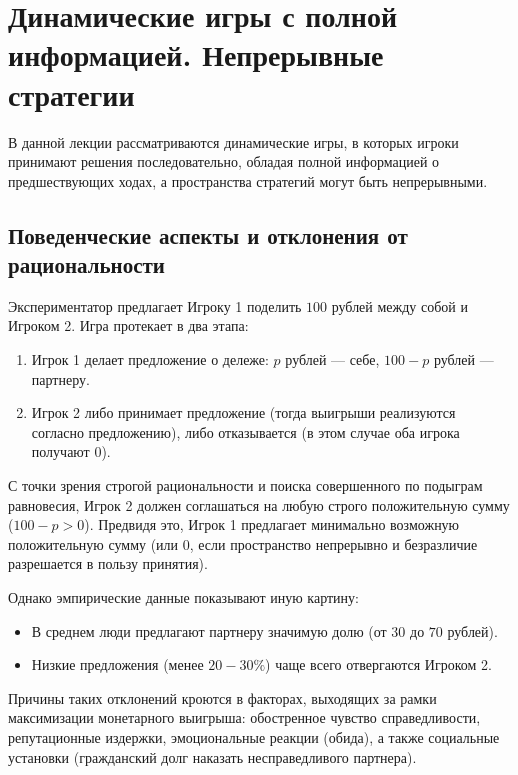 \section{Динамические игры с полной информацией. Непрерывные стратегии}

В данной лекции рассматриваются динамические игры, в которых игроки принимают решения последовательно, обладая полной информацией о предшествующих ходах, а пространства стратегий могут быть непрерывными.

\subsection{Поведенческие аспекты и отклонения от рациональности}

\begin{example}
Экспериментатор предлагает Игроку 1 поделить $100$ рублей между собой и Игроком 2. Игра протекает в два этапа:
\begin{enumerate}
    \item Игрок 1 делает предложение о дележе: $p$ рублей --- себе, $100 - p$ рублей --- партнеру.
    \item Игрок 2 либо принимает предложение (тогда выигрыши реализуются согласно предложению), либо отказывается (в этом случае оба игрока получают $0$).
\end{enumerate}
С точки зрения строгой рациональности и поиска совершенного по подыграм равновесия, Игрок 2 должен соглашаться на любую строго положительную сумму ($100 - p > 0$). Предвидя это, Игрок 1 предлагает минимально возможную положительную сумму (или $0$, если пространство непрерывно и безразличие разрешается в пользу принятия). 

Однако эмпирические данные показывают иную картину:
\begin{itemize}
    \item В среднем люди предлагают партнеру значимую долю (от $30$ до $70$ рублей).
    \item Низкие предложения (менее $20-30\%$) чаще всего отвергаются Игроком 2.
\end{itemize}
Причины таких отклонений кроются в факторах, выходящих за рамки максимизации монетарного выигрыша: обостренное чувство справедливости, репутационные издержки, эмоциональные реакции (обида), а также социальные установки (гражданский долг наказать несправедливого партнера).
\end{example}

